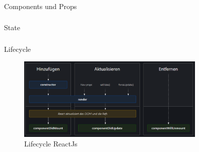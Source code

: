 \documentclass[aspectratio=169,14pt,xcolor=dvipsnames]{beamer}
\begin{document}
\begin{frame}[t]
    \frametitle{\subsecname}
    \framesubtitle{\secname}
    Components und Props
    
\end{frame}

\begin{frame}[t]
    \frametitle{\subsecname}
    \framesubtitle{\secname}
    State
    
\end{frame}

\begin{frame}[t]
    \frametitle{\subsecname}
    \framesubtitle{\secname}
    Lifecycle
    \begin{figure}[t]
        \includegraphics[width=0.8\textwidth]{images/React_lifecycle.png}
        \centering
        \caption{Lifecycle ReactJs}
    \end{figure}
\end{frame}
\end{document}
